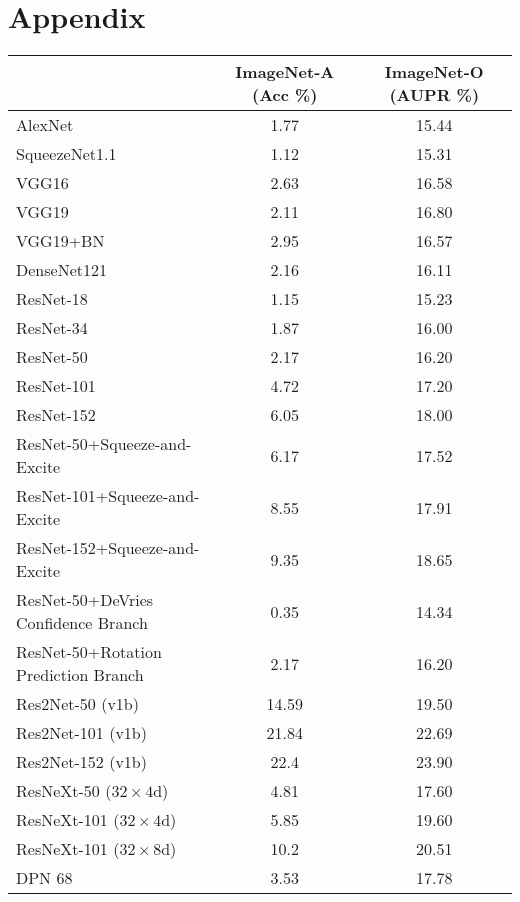 \documentclass[10pt,twocolumn,letterpaper]{article}
\begin{document}
\section{Appendix}
\begin{table*}[t]
\vspace{-10pt}
\begin{center}
\begin{tabular}{lcc}\hline
                        & ImageNet-A (Acc \%) & ImageNet-O (AUPR \%) \\
                        \hline AlexNet                 & 1.77  & 15.44     \\
SqueezeNet1.1           & 1.12  & 15.31     \\
VGG16                   & 2.63  & 16.58     \\
VGG19                   & 2.11  & 16.80     \\
VGG19+BN                & 2.95  & 16.57     \\
DenseNet121             & 2.16  & 16.11     \\
\hline
ResNet-18               & 1.15  & 15.23     \\
ResNet-34               & 1.87  & 16.00     \\
ResNet-50               & 2.17  & 16.20     \\
ResNet-101              & 4.72  & 17.20     \\
ResNet-152              & 6.05  & 18.00     \\
\hline
ResNet-50+Squeeze-and-Excite            & 6.17  & 17.52     \\
ResNet-101+Squeeze-and-Excite           & 8.55  & 17.91     \\
ResNet-152+Squeeze-and-Excite           & 9.35  & 18.65     \\
\hline
ResNet-50+DeVries Confidence Branch & 0.35 & 14.34 \\
ResNet-50+Rotation Prediction Branch & 2.17 & 16.20 \\
\hline
Res2Net-50 (v1b)        & 14.59 & 19.50     \\
Res2Net-101 (v1b)       & 21.84 & 22.69     \\
Res2Net-152 (v1b)       & 22.4  & 23.90     \\
\hline
ResNeXt-50 ($32\times4$d)   & 4.81  & 17.60 \\
ResNeXt-101 ($32\times4$d)  & 5.85  & 19.60 \\
ResNeXt-101 ($32\times8$d)   & 10.2  & 20.51 \\
\hline
DPN 68                  & 3.53  & 17.78     \\

\end{tabular}
\end{center}
\end{table*}
\end{document}
